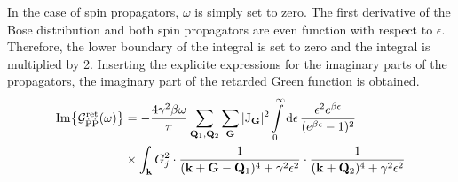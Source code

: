 In the case of spin propagators, $\omega$ is simply set to zero.
The first derivative of the Bose distribution and both spin propagators are even function with respect to $\epsilon$.
Therefore, the lower boundary of the integral is set to zero and the integral is multiplied by 2.
Inserting the explicite expressions for the imaginary parts of the propagators, the imaginary part of the retarded Green function is obtained.
%
\begin{align}
	\Im{\mathcal{G}_{\dot{\mathrm{P}}\dot{\mathrm{P}}}^{\mathrm{ret}}(\omega)} &= 
		-\frac{4 \gamma^{2} \beta \omega}{\pi}
		\sum\limits_{\vb{Q}_{1}, \vb{Q}_{2}}
		\sum\limits_{\vb{G}}
		\vert \mathrm{J}_{\vb{G}} \vert^{2}
		\int\limits_{0}^{\infty} \dd{\epsilon}
		\frac{\epsilon^{2} e^{\beta \epsilon}}{(e^{\beta \epsilon} - 1)^{2}}
		\notag \\
		&\times
		\int_{\vb{k}} G_{j}^{2} \cdot
		\frac{1}{(\vb{k}+\vb{G}-\vb{Q}_{1})^{4} + \gamma^{2} \epsilon^{2}} \cdot
		\frac{1}{(\vb{k} + \vb{Q}_{2})^{4} + \gamma^{2} \epsilon^{2}}
		\label{appeq:imaginary part Green function on the real axis}
\end{align}
%


























